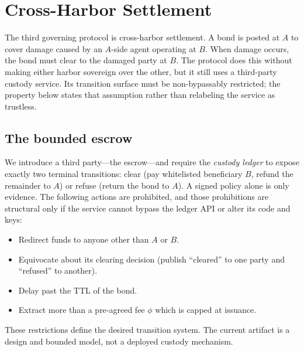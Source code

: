\documentclass[11pt,a4paper]{article}
\theoremstyle{definition}
\theoremstyle{remark}
\begin{document}
\section{Cross-Harbor Settlement}\label{sec:fh-settlement}

The third governing protocol is cross-harbor settlement. A bond is posted at
$A$ to cover damage caused by an $A$-side agent operating at $B$. When damage
occurs, the bond must clear to the damaged party at $B$. The protocol does this
without making either harbor sovereign over the other, but it still uses a
third-party custody service. Its transition surface must be non-bypassably
restricted; the property below states that assumption rather than relabeling the
service as trustless.



\subsection{The bounded escrow}\label{sec:fh-escrow}

We introduce a third party---the escrow---and require the \emph{custody ledger} to expose exactly two terminal transitions: clear (pay whitelisted beneficiary $B$, refund the remainder to $A$) or refuse (return the bond to $A$). A signed policy alone is only evidence. The following actions are prohibited, and those prohibitions are structural
only if the service cannot bypass the ledger API or alter its code and keys:

\begin{itemize}[nosep]
\item Redirect funds to anyone other than $A$ or $B$.
\item Equivocate about its clearing decision (publish ``cleared'' to one party and ``refused'' to another).
\item Delay past the TTL of the bond.
\item Extract more than a pre-agreed fee $\phi$ which is capped at issuance.
\end{itemize}

These restrictions define the desired transition system. The current artifact is a design and bounded model, not a deployed custody mechanism.
\end{document}
